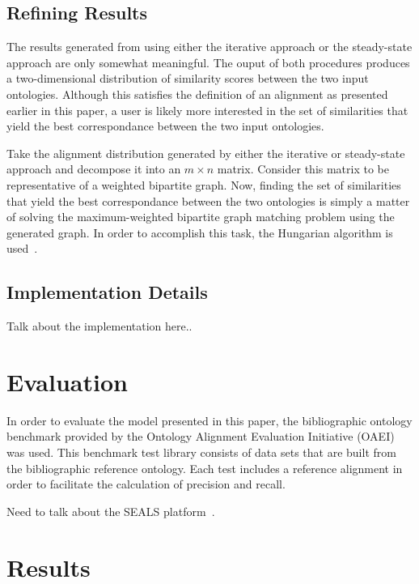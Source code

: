 \documentclass[letterpaper,twocolumn,12pt]{article}
\begin{document}
\subsection{Refining Results}

The results generated from using either the iterative approach or the steady-state approach are only somewhat meaningful.
The ouput of both procedures produces a two-dimensional distribution of similarity scores between the two input ontologies.
Although this satisfies the definition of an alignment as presented earlier in this paper, a user is likely more interested in the set of similarities that yield the best correspondance between the two input ontologies.

Take the alignment distribution generated by either the iterative or steady-state approach and decompose it into an $m \times n$ matrix.
Consider this matrix to be representative of a weighted bipartite graph.
Now, finding the set of similarities that yield the best correspondance between the two ontologies is simply a matter of solving the maximum-weighted bipartite graph matching problem using the generated graph.
In order to accomplish this task, the Hungarian algorithm is used~\cite{kuhn:1955:hungarian}.

\subsection{Implementation Details}

Talk about the implementation here..

\section{Evaluation}
\label{sec:eval}

In order to evaluate the model presented in this paper, the bibliographic ontology benchmark provided by the Ontology Alignment Evaluation Initiative (OAEI) was used.
This benchmark test library consists of data sets that are built from the bibliographic reference ontology.
Each test includes a reference alignment in order to facilitate the calculation of precision and recall.

Need to talk about the SEALS platform~\cite{esteban:2010:executing, wrigley:2010:evaluating}.

\section{Results}
\label{sec:results}
\end{document}

